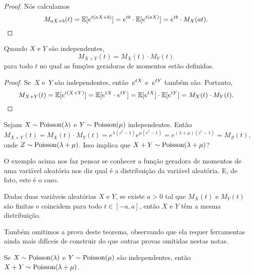 \begin{proof}
Nós calculamos
\[
M_{aX+b}(t) = \mathbb{E}[e ^{t(aX+b)}] = e ^{tb}\cdot \mathbb{E}[e ^{t(aX)}] = e ^{tb}\cdot M_X(at).
\qedhere
\]
\end{proof}

\begin{proposition}
Quando $ X $ e $ Y $ são independentes,
\[
M_{X+Y}(t) = M_X(t) \cdot M_Y(t)
\]
para todo $ t $ no qual as funções geradoras de momentos estão definidas.
\end{proposition}

\begin{proof}
Se~$X$ e~$Y$ são independentes, então~$e ^{tX}$ e~$e ^{tY}$ também são. Portanto,
\[M_{X+Y}(t) = \mathbb{E}[e ^{t(X+Y)}] = \mathbb{E}[e ^{tX}\cdot e ^{tY}] = \mathbb{E}[e ^{tX}] \cdot \mathbb{E}[e ^{tY}] = M_X(t)\cdot M_Y(t)
.
\qedhere
\]
\end{proof}

\begin{example}
Sejam $X\sim\mathrm{Poisson}(\lambda)$ e $Y\sim\mathrm{Poisson}(\mu)$ independentes.
Então
\[
M_{X+Y}(t) = M_{X}(t) \cdot M_Y(t) = e^{\lambda(e^{t}-1)}e^{\mu(e^{t}-1)} = e^{(\lambda+\mu)(e^{t}-1)} = M_Z(t),
\]
onde $Z \sim \mathrm{Poisson}(\lambda+\mu)$.
Isso implica que $X+Y \sim \mathrm{Poisson}(\lambda+\mu)$?
\end{example}

O exemplo acima nos faz pensar se conhecer a função geradora de momentos de uma variável aleatória nos diz qual é a distribuição da variável aleatória. E, de fato, este é o caso.

\begin{theorem}
Dadas duas variáveis aleatórias $X$ e $Y$, se existe $a>0$ tal que
$M_X(t)$ e $M_Y(t)$ são finitas e coincidem para todo $t \in [-a,a]$, então $X$ e $Y$ têm a mesma distribuição.
\end{theorem}

Também omitimos a prova deste teorema, observando que ela requer ferramentas ainda mais difíceis de construir do que outras provas omitidas nestas notas.

\begin{example}
Se $X\sim\mathrm{Poisson}(\lambda)$ e $Y\sim\mathrm{Poisson}(\mu)$ são independentes, então $X+Y \sim \mathrm{Poisson}(\lambda+\mu)$.
\end{example}

